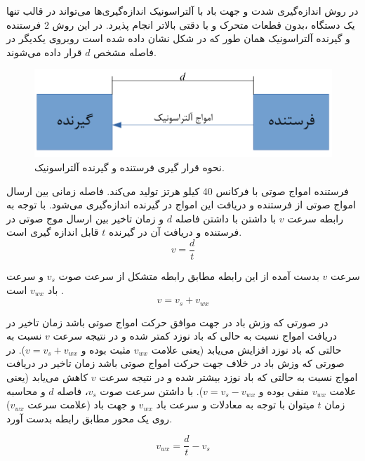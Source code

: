 در روش اندازه‌گیری شدت و جهت باد با آلتراسونیک اندازه‌گیری‌ها می‌تواند در قالب تنها یک دستگاه ،بدون قطعات متحرک و با دقتی بالاتر انجام پذیرد. در این روش 2 فرستنده و گیرنده آلتراسونیک همان طور که در شکل  نشان داده شده است روبروی یکدیگر در فاصله‌ مشخص $d$ قرار داده می‌شوند.

\begin{figure}[!h]
	\centering
	\includegraphics[width=0.6\linewidth]{Assets/ultrasonic one axis.pdf}
	\caption{نحوه قرار گیری فرستنده و گیرنده آلتراسونیک.}
	\label{fig:oneAxisUltrasonic}
\end{figure}

فرستنده امواج صوتی با فرکانس 40 کیلو هرتز تولید می‌کند. فاصله زمانی بین ارسال امواج صوتی از فرستنده و دریافت این امواج در گیرنده اندازه‌گیری می‌شود. با توجه به رابطه  سرعت $v$ با داشتن با داشتن فاصله $d$ و زمان تاخیر بین ارسال موج صوتی در فرستنده و دریافت آن در گیرنده  $t$ قابل اندازه گیری است.
\begin{equation}\label{eq:speed}
	v = \frac{d}{t}
\end{equation}

سرعت $v$ بدست آمده از این رابطه مطابق رابطه  متشکل از سرعت صوت $v_s$ و سرعت باد $v_{wx}$  است .
\begin{equation}\label{eq:expandSpeed}
	v = v_s + v_{wx}
\end{equation}

در صورتی که وزش باد در جهت موافق حرکت امواج صوتی باشد زمان تاخیر در دریافت امواج نسبت به حالی که باد نوزد کمتر شده و در نتیجه سرعت $v$ نسبت به حالتی که باد نوزد افزایش می‌یابد (یعنی علامت $v_{wx}$ مثبت بوده و $v = v_s+v_{wx}$). در صورتی که وزش باد در خلاف جهت حرکت امواج صوتی باشد زمان تاخیر در دریافت امواج نسبت به حالتی که باد نوزد بیشتر شده و در نتیجه سرعت $v$ کاهش می‌یابد (یعنی علامت $v_{wx}$ منفی بوده و $v = v_s-v_{wx}$). با داشتن سرعت صوت $v_s$، فاصله $d$ و محاسبه زمان $t$ میتوان با توجه به معادلات  و  سرعت باد $v_{wx}$ و جهت باد (علامت سرعت $v_{wx}$) روی یک محور مطابق رابطه  بدست آورد. 

\begin{equation}\label{eq:speedWindX}
	v_{wx} = \frac{d}{t} - v_s
\end{equation}

